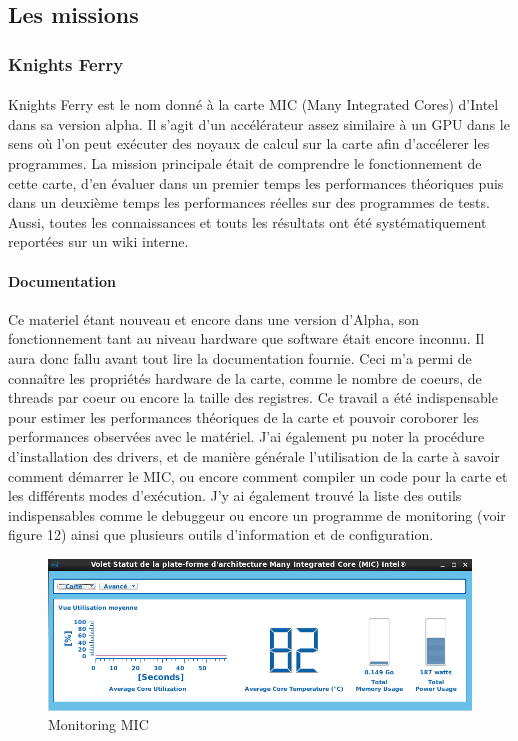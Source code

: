 \documentclass{article}
\begin{document}
		\subsection{Les missions}
			\subsubsection{Knights Ferry}
				\paragraph{}
				Knights Ferry est le nom donné à la carte MIC (Many Integrated Cores) d'Intel dans sa version alpha. Il s'agit 
				d'un accélérateur assez similaire à un GPU dans le sens où l'on peut exécuter des noyaux de calcul sur la 
				carte afin d'accélerer les programmes. La mission principale était de comprendre le fonctionnement de cette
				carte, d'en évaluer dans un premier temps les performances théoriques puis dans un deuxième temps les 
				performances réelles sur des programmes de tests. Aussi, toutes les connaissances et touts les résultats ont 
				été systématiquement reportées sur un wiki interne.
				\paragraph{Documentation}
				Ce materiel étant nouveau et encore dans une version d'Alpha, son fonctionnement tant au niveau hardware que
				software était encore inconnu. Il aura donc fallu avant tout lire la documentation fournie. Ceci m'a permi de 
				connaître les propriétés hardware de la carte, comme le nombre de coeurs, de threads par coeur ou encore 
				la taille des registres. Ce travail a été indispensable pour estimer les performances théoriques de la carte 
				et pouvoir coroborer les performances observées avec le matériel. \newline
				J'ai également pu noter la procédure d'installation des drivers, et de manière générale l'utilisation
				de la carte à savoir comment démarrer le MIC, ou encore comment compiler un code pour la carte et les 
				différents modes d'exécution. \newline
				J'y ai également trouvé la liste des outils indispensables comme le debuggeur ou encore un programme de
				monitoring (voir figure 12) ainsi que plusieurs outils d'information et de configuration.
				\begin{figure}
				\begin{center}
				\includegraphics[scale=0.40]{monitor_mic.png}
				\caption{Monitoring MIC}
				\end{center}
				\end{figure}
\end{document}
